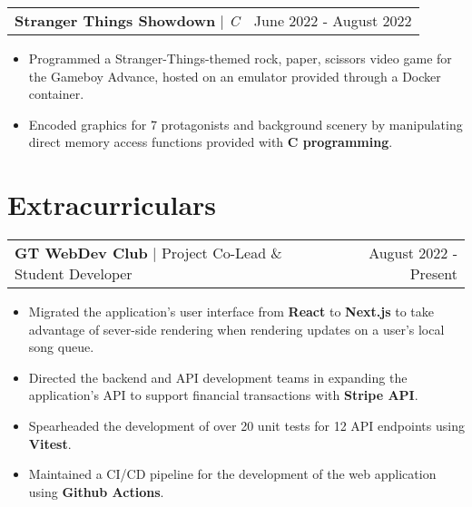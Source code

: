 \documentclass[letterpaper,11pt]{article}
\makeatletter
\newcommand{\resumeExperienceHeading}[3]{
    \begin{tabular*}{0.99\textwidth}[t]{l@{\extracolsep{\fill}}r}
      \textbf{#1} $\vert$ {#2} & {#3} \\
    \end{tabular*}\vspace{-3pt}
}
\newcommand{\resumeProjectHeading}[3]{
    \begin{tabular*}{0.97\textwidth}[t]{l@{\extracolsep{\fill}}r}
      \textbf{#1} $\vert$ \textit{#2}  & {#3}
    \end{tabular*}\vspace{-3pt}
}
\newcommand{\resumeItemListStart}{\begin{itemize}[noitemsep]\vspace{-4pt}}
\newcommand{\resumeItemListEnd}{\end{itemize}}
\makeatother
\begin{document}
    \resumeProjectHeading{Stranger Things Showdown}{C}{June 2022 - August 2022}
      \resumeItemListStart
        \item {Programmed a Stranger-Things-themed rock, paper, scissors video game for the Gameboy Advance, hosted on an emulator provided through a Docker container.}
        \item {Encoded graphics for 7 protagonists and background scenery by manipulating direct memory access functions provided with \textbf{C programming}.}
      \resumeItemListEnd

\section{Extracurriculars}
  \resumeExperienceHeading{GT WebDev Club}{Project Co-Lead \& Student Developer}{August 2022 - Present}
    \resumeItemListStart
      \item {Migrated the application's user interface from \textbf{React} to \textbf{Next.js} to take advantage of sever-side rendering when rendering updates on a user's local song queue.}
      \item {Directed the backend and API development teams in expanding the application's API to support financial transactions with \textbf{Stripe API}.}
      \item {Spearheaded the development of over 20 unit tests for 12 API endpoints using \textbf{Vitest}.}
      \item {Maintained a CI/CD pipeline for the development of the web application using \textbf{Github Actions}.}
    \resumeItemListEnd
\end{document}
